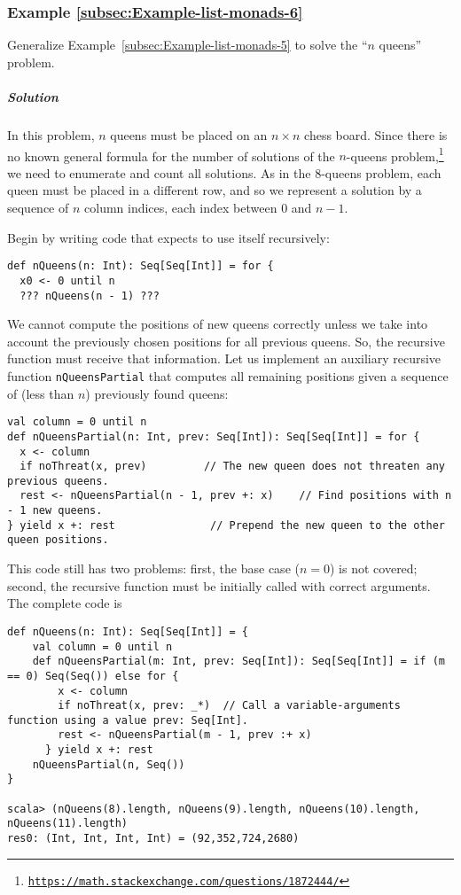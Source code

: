 \subsubsection{Example \label{subsec:Example-list-monads-6}\ref{subsec:Example-list-monads-6}}

Generalize Example~\ref{subsec:Example-list-monads-5} to solve the
\textsf{``}$n$ queens\textsf{''} problem.

\subparagraph{Solution}

In this problem, $n$ queens must be placed on an $n\times n$ chess
board. Since there is no known general formula for the number of solutions
of the $n$-queens problem,\footnote{\texttt{\href{https://math.stackexchange.com/questions/1872444/}{https://math.stackexchange.com/questions/1872444/}}}
we need to enumerate and count all solutions. As in the $8$-queens
problem, each queen must be placed in a different row, and so we represent
a solution by a sequence of $n$ column indices, each index between
$0$ and $n-1$.

Begin by writing code that expects to use itself recursively:
\begin{lstlisting}
def nQueens(n: Int): Seq[Seq[Int]] = for {
  x0 <- 0 until n
  ??? nQueens(n - 1) ???
\end{lstlisting}
We cannot compute the positions of new queens correctly unless we
take into account the previously chosen positions for all previous
queens. So, the recursive function must receive that information.
Let us implement an auxiliary recursive function \lstinline!nQueensPartial!
that computes all remaining positions given a sequence of (less than
$n$) previously found queens:
\begin{lstlisting}
val column = 0 until n
def nQueensPartial(n: Int, prev: Seq[Int]): Seq[Seq[Int]] = for {
  x <- column
  if noThreat(x, prev)         // The new queen does not threaten any previous queens.
  rest <- nQueensPartial(n - 1, prev +: x)    // Find positions with n - 1 new queens.
} yield x +: rest               // Prepend the new queen to the other queen positions.
\end{lstlisting}

This code still has two problems: first, the base case ($n=0$) is
not covered; second, the recursive function must be initially called
with correct arguments. The complete code is
\begin{lstlisting}
def nQueens(n: Int): Seq[Seq[Int]] = {
    val column = 0 until n
    def nQueensPartial(m: Int, prev: Seq[Int]): Seq[Seq[Int]] = if (m == 0) Seq(Seq()) else for {
        x <- column
        if noThreat(x, prev: _*)  // Call a variable-arguments function using a value prev: Seq[Int].
        rest <- nQueensPartial(m - 1, prev :+ x)
      } yield x +: rest
    nQueensPartial(n, Seq())
}

scala> (nQueens(8).length, nQueens(9).length, nQueens(10).length, nQueens(11).length)
res0: (Int, Int, Int, Int) = (92,352,724,2680)
\end{lstlisting}


